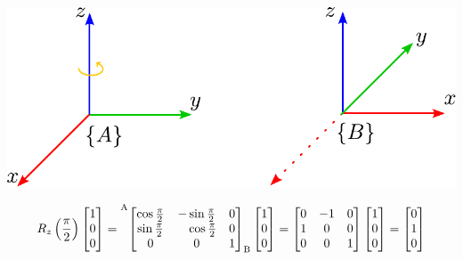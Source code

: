 \begin{frame}
    \begin{center}
    \begin{minipage}{0.26\linewidth}
        \includegraphics[width=\columnwidth]{./images/3d_rotation_example.pdf}
    \end{minipage}
    \hspace{1em}
    \begin{minipage}{0.70\linewidth}
        \small
        \begin{equation*}
            R_{z}\left(\frac{\pi}{2}\right)
            \begin{bmatrix}
                1\\
                0\\
                0
            \end{bmatrix} =
            \toCoord{\fromCoord{\begin{bmatrix}
                \cos \frac{\pi}{2} & -\sin \frac{\pi}{2} & 0\\
                \sin \frac{\pi}{2} & \quad \cos \frac{\pi}{2} & 0\\
                0 & 0 & 1
            \end{bmatrix}}{B}}{A}
            \begin{bmatrix}
                1\\
                0\\
                0
            \end{bmatrix}=
            \begin{bmatrix}
                0 & -1 & 0\\
                1 & 0 & 0\\
                0 & 0 & 1
            \end{bmatrix}
            \begin{bmatrix}
                1\\
                0\\
                0
            \end{bmatrix}=
            \begin{bmatrix}
                0\\
                1\\
                0
            \end{bmatrix}
        \end{equation*}
    \end{minipage}
\end{center}

\end{frame}

